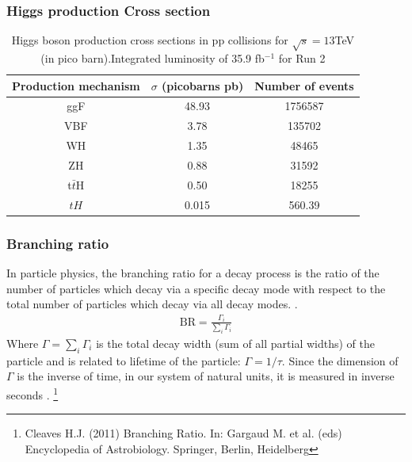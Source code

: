 \documentclass[11pt]{beamer}
\begin{document}
\begin{frame}
\frametitle{Higgs production Cross section}
\begin{table}
	\caption*{Higgs boson production cross sections  in pp collisions for $\sqrt{s}=13$TeV  (in
		pico barn).Integrated luminosity of 35.9 fb$^{-1}$ for Run 2\footnotemark}
	\begin{tabular}{|c|c|c|}
		\hline
		Production mechanism &
		$\sigma$ (picobarns pb)
		&Number of events \\
		\hline
		ggF &
		48.93 &
		1756587\\
		\hline
		VBF &
		3.78&
		135702\\
		\hline
		WH & 1.35 & 48465\\
		\hline
		ZH &0.88 & 31592\\
		\hline
		t$\bar{t}$H &
		0.50&
		18255\\
		\hline
		$tH$ &
		0.015&
		560.39\\
		\hline
	\end{tabular}
\end{table}


\end{frame}



\begin{frame}
\frametitle{Branching ratio}
\small{In particle physics, the branching ratio for a decay process is the ratio of the number of particles which decay via a specific decay mode with respect to the total number of particles which decay via all decay modes. \footnotemark.}
\begin{align}
\text{BR} =\frac{\Gamma_i}{\sum_{i}\Gamma_i}
\end{align}
\small{Where $\Gamma=\sum_i\Gamma_i$ is the total decay width (sum of all partial widths) of the particle and is related to lifetime of the particle: $\Gamma=1/\tau$.
Since the dimension of $\Gamma$ is the inverse of time, in our system of natural units, it is measured in inverse seconds} .%
\footnote[0]{\tiny{Cleaves H.J. (2011) Branching Ratio. In: Gargaud M. et al. (eds) Encyclopedia of Astrobiology. Springer, Berlin, Heidelberg} }
\end{frame}
 
\end{document}
